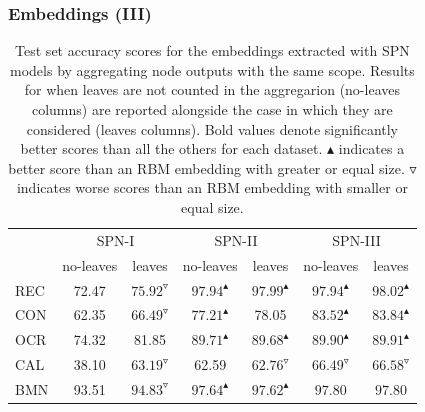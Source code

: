 \documentclass[10pt, t, xcolor={usenames,dvipsnames,svgnames}, compress]{beamer}
\begin{document}
\begin{frame}
  \frametitle{Embeddings (III)}
  \begin{table}[!t]
    \footnotesize
    \caption[datasets]{Test set accuracy scores for the embeddings
      extracted with \textsf{SPN} models by aggregating node outputs
      with the same scope.
      Results for when leaves are not counted in the aggregarion
      (\textsf{no-leaves} columns) are reported alongside the case in which they are
      considered (\textsf{leaves} columns).
      Bold values denote significantly better scores than all the others
      for each dataset.
      $\blacktriangle$ indicates a better score than an RBM embedding
      with greater or equal size. $\triangledown$ indicates worse
      scores than an RBM embedding with smaller or equal size.}
    \centering
    \small
    \setlength{\tabcolsep}{3pt}  
    \begin{tabular}{l c c c c c c}
      \toprule
      & \multicolumn{2}{c}{\textsf{SPN-I}} &
                                             \multicolumn{2}{c}{\textsf{SPN-II}}
      & \multicolumn{2}{c}{\textsf{SPN-III}}\\
      
      &no-leaves  & leaves& no-leaves& leaves& no-leaves& leaves\\
      \midrule
      \textsf{REC} & 72.47 & $75.92^{\triangledown}$ & $\mathbf{97.94}^{\blacktriangle}$ & $\mathbf{97.99}^{\blacktriangle}$ & $\mathbf{97.94}^{\blacktriangle}$ & $\mathbf{98.02}^{\blacktriangle}$ \\
      \midrule
      \textsf{CON} & 62.35 & $66.49^{\triangledown}$ & $77.21^{\blacktriangle}$ & 78.05 & $\mathbf{83.52}^{\blacktriangle}$ & $\mathbf{83.84}^{\blacktriangle}$ \\
      \midrule
      \textsf{OCR} & 74.32 & 81.85 & $89.71^{\blacktriangle}$ & $89.68^{\blacktriangle}$ & $\mathbf{89.90}^{\blacktriangle}$ & $\mathbf{89.91}^{\blacktriangle}$ \\
      \midrule
      \textsf{CAL} & 38.10 & $63.19^{\triangledown}$  & 62.59 & $62.76^{\triangledown}$ & $\mathbf{66.49}^{\triangledown}$ & $\mathbf{66.58}^{\triangledown}$ \\
      \midrule
      \textsf{BMN} & 93.51 & $94.83^{\triangledown}$ & $97.64^{\blacktriangle}$ & $97.62^{\blacktriangle}$ & $\mathbf{97.80}$ & $\mathbf{97.80}$ \\
      \bottomrule
    \end{tabular}
    \label{tab:model-scope-aggr}
  \end{table}
\end{frame}
\end{document}
